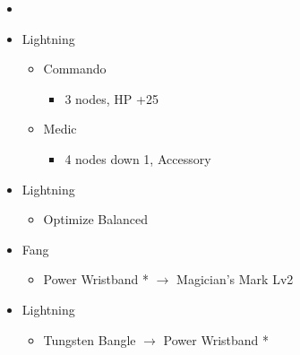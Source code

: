 	\begin{menu}
		\begin{itemize}
			\paradigm
			\begin{itemize}
				\item {}%
				      {\paradigmline[1]{\textit{\com}}{\textit{\com}}{\textit{\rav}}}
				      {\paradigmline{\rav}{\com}{\rav}}%
				      {\paradigmline{\rav}{\sab}{\rav}}%
				      {\paradigmline{\rav}{\sen}{\rav}}%
				      {\paradigmline{(\com)}{(\com)}{\syn}}%
				      {\paradigmline{(\com)}{\com}{(\med)}}
			\end{itemize}
			\crystarium
			\begin{itemize}
				\item Lightning
				      \begin{itemize}
					      \item Commando
					            \begin{itemize}
						            \item 3 nodes, HP +25
					            \end{itemize}
					      \item Medic
					            \begin{itemize}
						            \item 4 nodes down 1, Accessory
					            \end{itemize}
				      \end{itemize}
			\end{itemize}
			\equip
			\begin{itemize}
				\item Lightning
				      \begin{itemize}
					      \item Optimize Balanced
				      \end{itemize}
				\item Fang
				      \begin{itemize}
					      \item Power Wristband * $\rightarrow$ Magician's Mark Lv2
				      \end{itemize}
				\item Lightning
				      \begin{itemize}
					      \item Tungsten Bangle $\rightarrow$ Power Wristband *
				      \end{itemize}
			\end{itemize}
		\end{itemize}
	\end{menu}

